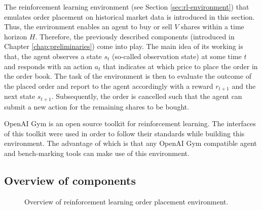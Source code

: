 The reinforcement learning environment (see Section \ref{sec:rl-environment}) that emulates order placement on historical market data is introduced in this section.
Thus, the environment enables an agent to buy or sell $V$ shares within a time horizon $H$.
Therefore, the previously described components (introduced in Chapter \ref{chap:preliminaries}) come into play.
The main idea of its working is that, the agent observes a state $s_t$ (so-called observation state) at some time $t$ and responds with an action $a_t$ that indicates at which price to place the order in the order book.
The task of the environment is then to evaluate the outcome of the placed order and report to the agent accordingly with a reward $r_{t+1}$ and the next state $s_{t+1}$.
Subsequently, the order is cancelled such that the agent can submit a new action for the remaining shares to be bought.

OpenAI Gym \cite{brockman2016openai} is an open source toolkit for reinforcement learning.
The interfaces of this toolkit were used in order to follow their standards while building this environment.
The advantage of which is that any OpenAI Gym compatible agent and bench-marking tools can make use of this environment.

\subsection{Overview of components}

\begin{figure}[H]
    \centering
    \caption{Overview of reinforcement learning order placement environment.}
    \label{fig:rl-env-overview}
\end{figure}

